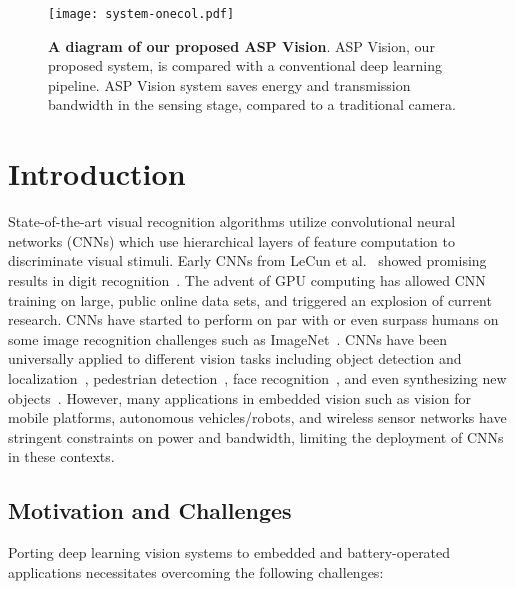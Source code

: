 \documentclass[10pt,twocolumn,letterpaper]{article}
\newcommand{\Section}[1]{\vspace{-4pt}\section{#1}\vspace{-4pt}}
\newcommand{\Subsection}[1]{\vspace{-3pt}\subsection{#1}\vspace{-3pt}}
\begin{document}
\begin{figure}[t]
\begin{center}
   \texttt{[image: system-onecol.pdf]}
\end{center}
   \caption{\textbf{A diagram of our proposed ASP Vision}. ASP Vision, our proposed system, is compared with a conventional deep learning pipeline. ASP Vision system saves energy and transmission bandwidth in the sensing stage, compared to a traditional camera.}
\label{fig:systemdiagram}
\end{figure}

\Section{Introduction}
	State-of-the-art visual recognition algorithms utilize convolutional neural networks (CNNs) which use hierarchical layers of feature computation to discriminate visual stimuli. Early CNNs from LeCun et al.~\cite{lecun1998gradient} showed promising results in digit recognition~\cite{lecun1998mnist}. The advent of GPU computing has allowed CNN training on large, public online data sets, and triggered an explosion of current research. CNNs have started to perform on par with or even surpass humans on some image recognition challenges such as ImageNet~\cite{krizhevsky2012imagenet, russakovsky2014imagenet}. CNNs have been universally applied to different vision tasks including object detection and localization~\cite{szegedy2014going}, pedestrian detection~\cite{szarvas2005pedestrian}, face recognition~\cite{SchroffKP15}, and even synthesizing new objects~\cite{dosovitskiy2015learning}. However, many applications in embedded vision such as vision for mobile platforms, autonomous vehicles/robots, and wireless sensor networks have stringent constraints on power and bandwidth, limiting the deployment of CNNs in these contexts. 

\Subsection{Motivation and Challenges}
Porting deep learning vision systems to embedded and battery-operated applications necessitates overcoming the following challenges:
\end{document}
